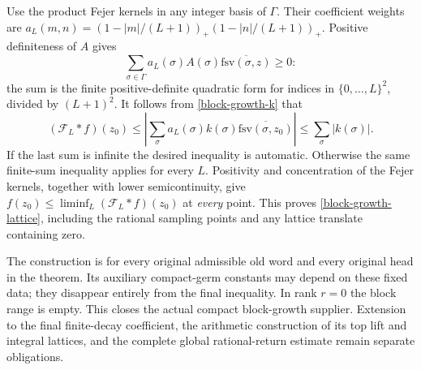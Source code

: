 Use the product Fejer kernels in any integer basis of $\Gamma$.
Their coefficient weights are
$a_L(m,n)=(1-|m|/(L+1))_+(1-|n|/(L+1))_+$.
Positive definiteness of $A$ gives
\[
       \sum_{\sigma\in\Gamma}a_L(\sigma)A(\sigma)
                           \overline{\mathrm{fsv}(\sigma,z)}\ge0:
\]
the sum is the finite positive-definite quadratic form for
indices in $\{0,\ldots,L\}^2$, divided by $(L+1)^2$.
It follows from \eqref{block-growth-k} that
\[
       (\mathcal F_L*f)(z_0)
        \le\left|\sum_\sigma a_L(\sigma)k(\sigma)
                          \overline{\mathrm{fsv}(\sigma,z_0)}\right|
        \le\sum_\sigma|k(\sigma)|.
\]
If the last sum is infinite the desired inequality is automatic.
Otherwise the same finite-sum inequality applies for every $L$.
Positivity and concentration of the Fejer kernels, together with
lower semicontinuity, give
$f(z_0)\le\liminf_L(\mathcal F_L*f)(z_0)$ at \emph{every} point.
This proves \eqref{block-growth-lattice}, including the rational
sampling points and any lattice translate containing zero.

The construction is for every original admissible old word and
every original head in the theorem.  Its auxiliary compact-germ
constants may depend on these fixed data; they disappear entirely
from the final inequality.  In rank $r=0$ the block range is empty.
This closes the actual compact block-growth supplier.  Extension
to the final finite-decay coefficient, the arithmetic construction
of its top lift and integral lattices, and the complete global
rational-return estimate remain separate obligations.
